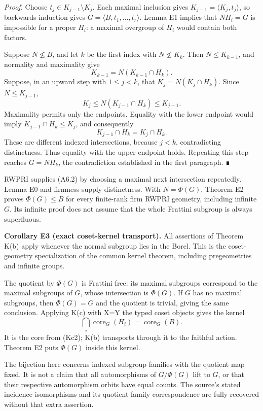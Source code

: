 \documentclass[
  10pt,
  letterpaper,
]{article}
\begin{document}
\emph{Proof.} Choose \(t_j\in K_{j-1}\setminus K_j\). Each maximal
inclusion gives \(K_{j-1}=\langle K_j,t_j\rangle\), so backwards
induction gives \(G=\langle B,t_1,\ldots,t_r\rangle\). Lemma E1 implies
that \(NH_i=G\) is impossible for a proper \(H_i\): a maximal overgroup
of \(H_i\) would contain both factors.

Suppose \(N\not\leq B\), and let \(k\) be the first index with
\(N\not\leq K_k\). Then \(N\leq K_{k-1}\), and normality and maximality
give \[
K_{k-1}=N(K_{k-1}\cap H_k).
\] Suppose, in an upward step with \(1\leq j<k\), that
\(K_j=N(K_j\cap H_k)\). Since \(N\leq K_{j-1}\), \[
K_j\leq N(K_{j-1}\cap H_k)\leq K_{j-1}.
\] Maximality permits only the endpoints. Equality with the lower
endpoint would imply \(K_{j-1}\cap H_k\leq K_j\), and consequently \[
K_{j-1}\cap H_k=K_j\cap H_k.
\] These are different indexed intersections, because \(j<k\),
contradicting distinctness. Thus equality with the upper endpoint holds.
Repeating this step reaches \(G=NH_k\), the contradiction established in
the first paragraph. ∎

RWPRI supplies (A6.2) by choosing a maximal next intersection
repeatedly. Lemma E0 and firmness supply distinctness. With
\(N=\Phi(G)\), Theorem E2 proves \(\Phi(G)\leq B\) for every finite-rank
firm RWPRI geometry, including infinite \(G\). Its infinite proof does
not assume that the whole Frattini subgroup is always superfluous.

\textbf{Corollary E3 (exact coset-kernel transport).} All assertions of
Theorem K(b) apply whenever the normal subgroup lies in the Borel. This
is the coset-geometry specialization of the common kernel theorem,
including pregeometries and infinite groups.

The quotient by \(\Phi(G)\) is Frattini free: its maximal subgroups
correspond to the maximal subgroups of \(G\), whose intersection is
\(\Phi(G)\). If \(G\) has no maximal subgroups, then \(\Phi(G)=G\) and
the quotient is trivial, giving the same conclusion. Applying K(c) with
X=Y the typed coset objects gives the kernel \[
\bigcap_i\operatorname{core}_G(H_i)
 =\operatorname{core}_G(B).
\tag{A6.4}
\] It is the core from (Kc2); K(b) transports through it to the faithful
action. Theorem E2 puts \(\Phi(G)\) inside this kernel.

The bijection here concerns indexed subgroup families with the quotient
map fixed. It is not a claim that all automorphisms of \(G/\Phi(G)\)
lift to \(G\), or that their respective automorphism orbits have equal
counts. The source's stated incidence isomorphisms and its
quotient-family correspondence are fully recovered without that extra
assertion.
\end{document}
